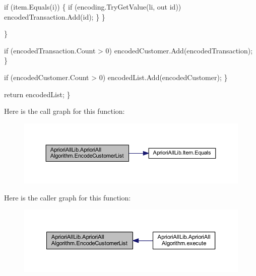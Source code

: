 \begin{DoxyCode}
                            \textcolor{keywordflow}{if} (item.Equals(i)) \{
                                \textcolor{keywordflow}{if} (encoding.TryGetValue(li, out \textcolor{keywordtype}{id}))
                                    encodedTransaction.Add(\textcolor{keywordtype}{id});
                            \}
                        \}

                    \}

                    \textcolor{keywordflow}{if} (encodedTransaction.Count > 0)
                        encodedCustomer.Add(encodedTransaction);
                \}

                \textcolor{keywordflow}{if} (encodedCustomer.Count > 0)
                    encodedList.Add(encodedCustomer);
            \}

            \textcolor{keywordflow}{return} encodedList;
        \}
\end{DoxyCode}


Here is the call graph for this function\-:
\nopagebreak
\begin{figure}[H]
\begin{center}
\leavevmode
\includegraphics[width=350pt]{class_apriori_all_lib_1_1_apriori_all_algorithm_a2250ee6a09f30990fc8e6f50d0600bdc_cgraph}
\end{center}
\end{figure}




Here is the caller graph for this function\-:
\nopagebreak
\begin{figure}[H]
\begin{center}
\leavevmode
\includegraphics[width=350pt]{class_apriori_all_lib_1_1_apriori_all_algorithm_a2250ee6a09f30990fc8e6f50d0600bdc_icgraph}
\end{center}
\end{figure}


